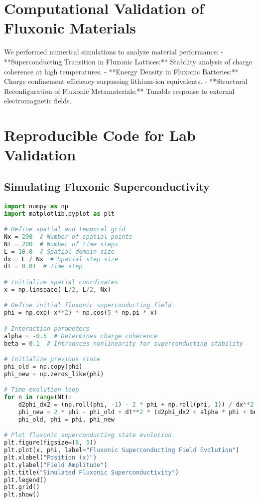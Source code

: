 \documentclass{article}
\begin{document}
\section{Computational Validation of Fluxonic Materials}
We performed numerical simulations to analyze material performance:
- **Superconducting Transition in Fluxonic Lattices:** Stability analysis of charge coherence at high temperatures.
- **Energy Density in Fluxonic Batteries:** Charge confinement efficiency surpassing lithium-ion equivalents.
- **Structural Reconfiguration of Fluxonic Metamaterials:** Tunable response to external electromagnetic fields.

\section{Reproducible Code for Lab Validation}
\subsection{Simulating Fluxonic Superconductivity}
\begin{lstlisting}[language=Python]
import numpy as np
import matplotlib.pyplot as plt

# Define spatial and temporal grid
Nx = 200  # Number of spatial points
Nt = 200  # Number of time steps
L = 10.0  # Spatial domain size
dx = L / Nx  # Spatial step size
dt = 0.01  # Time step

# Initialize spatial coordinates
x = np.linspace(-L/2, L/2, Nx)

# Define initial fluxonic superconducting field
phi = np.exp(-x**2) * np.cos(5 * np.pi * x)

# Interaction parameters
alpha = -0.5  # Determines charge coherence
beta = 0.1  # Introduces nonlinearity for superconducting stability

# Initialize previous state
phi_old = np.copy(phi)
phi_new = np.zeros_like(phi)

# Time evolution loop
for n in range(Nt):
    d2phi_dx2 = (np.roll(phi, -1) - 2 * phi + np.roll(phi, 1)) / dx**2
    phi_new = 2 * phi - phi_old + dt**2 * (d2phi_dx2 + alpha * phi + beta * phi**3)
    phi_old, phi = phi, phi_new

# Plot fluxonic superconducting state evolution
plt.figure(figsize=(8, 5))
plt.plot(x, phi, label="Fluxonic Superconducting Field Evolution")
plt.xlabel("Position (x)")
plt.ylabel("Field Amplitude")
plt.title("Simulated Fluxonic Superconductivity")
plt.legend()
plt.grid()
plt.show()
\end{lstlisting}
\end{document}
